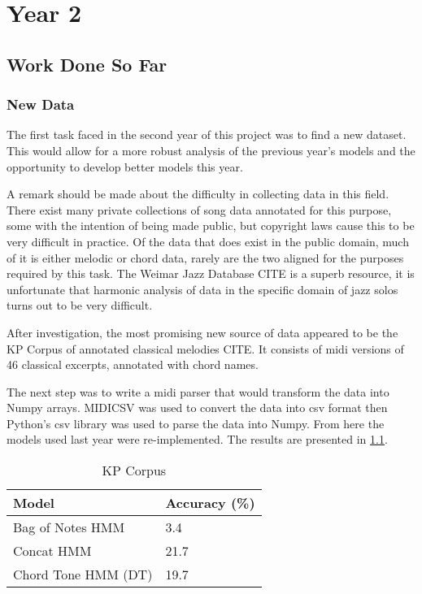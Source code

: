 \documentclass[bsc,logo,twoside,singlespacing,parskip,deptreport]{infthesis}
\begin{document}
\chapter{Year 2}

\section{Work Done So Far}
\subsection{New Data}
The first task faced in the second year of this project was to find a new dataset. This would allow for a more robust analysis of the previous year's models and the opportunity to develop better models this year.

A remark should be made about the difficulty in collecting data in this field. There exist many private collections of song data annotated for this purpose, some with the intention of being made public, but copyright laws cause this to be very difficult in practice. Of the data that does exist in the public domain, much of it is either melodic or chord data, rarely are the two aligned for the purposes required by this task. The Weimar Jazz Database CITE is a superb resource, it is unfortunate that harmonic analysis of data in the specific domain of jazz solos turns out to be very difficult.

After investigation, the most promising new source of data appeared to be the KP Corpus of annotated classical melodies CITE. It consists of midi versions of 46 classical excerpts, annotated with chord names.

The next step was to write a midi parser that would transform the data into Numpy arrays. MIDICSV was used to convert the data into csv format then Python's csv library was used to parse the data into Numpy. From here the models used last year were re-implemented. The results are presented in \ref{kp}.

\begin{table}
\centering
\caption{KP Corpus}
\label{kp}
\begin{tabular}{l|l}
Model               & Accuracy (\%) \\ \hline
Bag of Notes HMM    & 3.4           \\
Concat HMM          & 21.7          \\
Chord Tone HMM (DT) & 19.7          \\
\end{tabular}
\end{table} 
\end{document}
